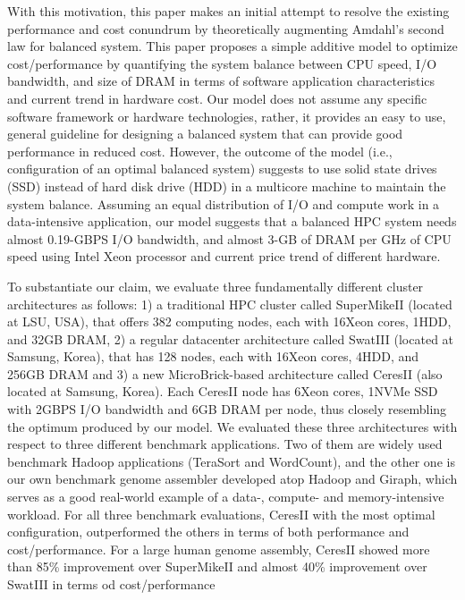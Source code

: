 \documentclass[journal]{IEEEtran}
\begin{document}
With this motivation, this paper makes an initial attempt to resolve the existing performance and cost conundrum by theoretically augmenting Amdahl's second law for balanced system. This paper proposes a simple additive model to optimize cost/performance by quantifying the system balance between CPU speed, I/O bandwidth, and size of DRAM in terms of software application characteristics and current trend in hardware cost. Our model does not assume any specific software framework or hardware technologies, rather, it provides an easy to use, general guideline for designing a balanced system that can provide good performance in reduced cost. However, the outcome of the model (i.e., configuration of an optimal balanced system) suggests to use solid state drives (SSD) instead of hard disk drive (HDD) in a multicore machine to maintain the system balance. Assuming an equal distribution of I/O  and compute work in a data-intensive application, our model suggests that a balanced HPC system needs almost 0.19-GBPS I/O bandwidth, and almost 3-GB of DRAM per GHz of CPU speed using Intel Xeon processor  and current price trend of different hardware. 


To substantiate our claim, we evaluate three fundamentally different cluster architectures as follows: 1) a traditional HPC cluster called SuperMikeII (located at LSU, USA), that offers 382 computing nodes, each with 16Xeon cores, 1HDD, and 32GB DRAM, 2) a regular datacenter architecture called SwatIII (located at Samsung, Korea), that has 128 nodes, each with 16Xeon cores, 4HDD, and 256GB DRAM and 3) a new MicroBrick-based architecture called CeresII (also located at Samsung, Korea). Each CeresII node has  6Xeon cores, 1NVMe SSD  with 2GBPS I/O bandwidth and 6GB DRAM per node, thus closely resembling the optimum produced by our model. We evaluated these three architectures with respect to three different benchmark applications. Two of them are widely  used benchmark Hadoop applications (TeraSort and WordCount), and the other one is our own benchmark genome assembler developed atop Hadoop and Giraph, which serves as a good real-world example of a data-, compute- and memory-intensive workload. For all three benchmark evaluations, CeresII with the most optimal configuration, outperformed the others in terms of both performance and cost/performance. For a large human genome assembly, CeresII showed more than 85\% improvement over SuperMikeII and almost 40\% improvement over SwatIII in terms od cost/performance%
\end{document}
